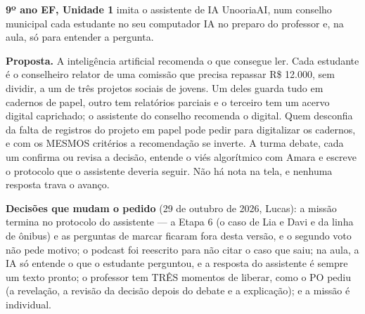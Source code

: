 
\textbf{9º ano EF, Unidade 1} \textperiodcentered{} imita o assistente de IA
UnooriaAI, num conselho municipal \textperiodcentered{} cada estudante no seu
computador \textperiodcentered{} IA no preparo do professor e, na aula, só
para entender a pergunta.

\textbf{Proposta.} A inteligência artificial recomenda o que consegue ler.
Cada estudante é o conselheiro relator de uma comissão que precisa repassar
R\$ 12.000, sem dividir, a um de três projetos sociais de jovens. Um deles
guarda tudo em cadernos de papel, outro tem relatórios parciais e o terceiro
tem um acervo digital caprichado; o assistente do conselho recomenda o
digital. Quem desconfia da falta de registros do projeto em papel pode pedir
para digitalizar os cadernos, e com os MESMOS critérios a recomendação se
inverte. A turma debate, cada um confirma ou revisa a decisão, entende o viés
algorítmico com Amara e escreve o protocolo que o assistente deveria seguir.
Não há nota na tela, e nenhuma resposta trava o avanço.

\textbf{Decisões que mudam o pedido} (29 de outubro de 2026, Lucas): a
missão termina no protocolo do assistente --- a Etapa 6 (o caso de Lia e Davi
e da linha de ônibus) e as perguntas de marcar ficaram fora desta versão, e
o segundo voto não pede motivo; o podcast foi reescrito para não citar o caso
que saiu; na aula, a IA só entende o que o estudante perguntou, e a resposta
do assistente é sempre um texto pronto; o professor tem TRÊS momentos de
liberar, como o PO pediu (a revelação, a revisão da decisão depois do debate
e a explicação); e a missão é individual.

